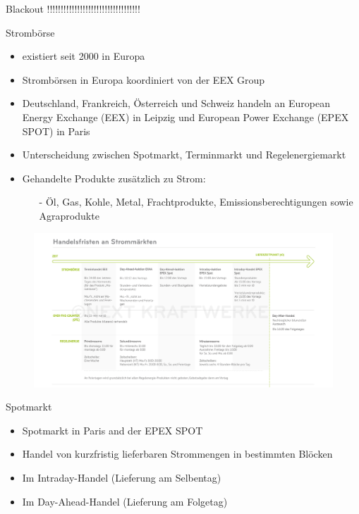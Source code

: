 \documentclass[aspectratio=1610, professionalfonts, 9pt]{beamer}
\begin{document}
\begin{frame}{Blackout}
!!!!!!!!!!!!!!!!!!!!!!!!!!!!!!!!!!
\end{frame}




\begin{frame}{Strombörse}
\begin{itemize}
  \item existiert seit \num{2000} in Europa
  \item Strombörsen in Europa koordiniert von der EEX Group
  \item Deutschland, Frankreich, Österreich
  und Schweiz handeln an European Energy Exchange (EEX) in Leipzig
 und European Power Exchange (EPEX SPOT) in Paris
 \item Unterscheidung zwischen Spotmarkt, Terminmarkt und Regelenergiemarkt
\item Gehandelte Produkte zusätzlich zu Strom:
    \begin{itemize}
      \item[-]Öl, Gas, Kohle, Metal, Frachtprodukte, Emissionsberechtigungen sowie Agraprodukte
    \end{itemize}
\end{itemize}
\end{frame}


{
\begin{frame}
  \begin{figure}
  \includegraphics[width=1.1\textwidth]{images/stromprodukte.jpg}
\end{figure}
\end{frame}
}

\begin{frame}{Spotmarkt}
  \begin{itemize}
    \item Spotmarkt in Paris and der EPEX SPOT
    \item Handel von kurzfristig lieferbaren Strommengen in bestimmten Blöcken
    \item Im Intraday-Handel (Lieferung am Selbentag)
    \item Im Day-Ahead-Handel (Lieferung am Folgetag)
  \end{itemize}
\end{frame}
\end{document}
